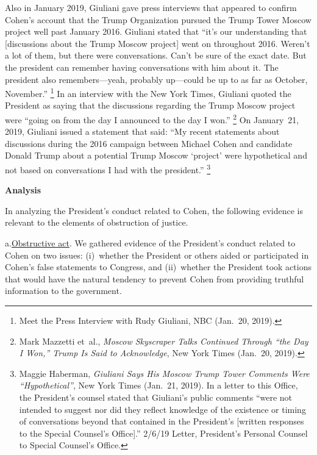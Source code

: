 Also in January 2019, Giuliani gave press interviews that appeared to confirm Cohen's account that the Trump Organization pursued the Trump Tower Moscow project well past January 2016.
Giuliani stated that ``it's our understanding that [discussions about the Trump Moscow project] went on throughout 2016.
Weren't a lot of them, but there were conversations.
Can't be sure of the exact date.
But the president can remember having conversations with him about it.
The president also remembers---yeah, probably up---could be up to as far as October, November.''%
\footnote{Meet the Press Interview with Rudy Giuliani, NBC (Jan.~20, 2019).}
In an interview with the New York Times, Giuliani quoted the President as saying that the discussions regarding the Trump Moscow project were ``going on from the day I announced to the day I won.''%
\footnote{Mark Mazzetti et~al., \textit{Moscow Skyscraper Talks Continued Through ``the Day I Won,'' Trump Is Said to Acknowledge}, New York Times (Jan.~20, 2019).}
On January~21, 2019, Giuliani issued a statement that said: ``My recent statements about discussions during the 2016 campaign between Michael Cohen and candidate Donald Trump about a potential Trump Moscow `project' were hypothetical and not based on conversations I had with the president.''%
\footnote{Maggie Haberman, \textit{Giuliani Says His Moscow Trump Tower Comments Were ``Hypothetical''}, New York Times (Jan.~21, 2019).
In a letter to this Office, the President's counsel stated that Giuliani's public comments ``were not intended to suggest nor did they reflect knowledge of the existence or timing of conversations beyond that contained in the President's [written responses to the Special Counsel's Office].''
2/6/19 Letter, President's Personal Counsel to Special Counsel's Office.}

\filbreak

\begin{center}
\textbf{Analysis}
\end{center}

In analyzing the President's conduct related to Cohen, the following evidence is relevant to the elements of obstruction of justice.

a.\qquad\underline{Obstructive act}.
We gathered evidence of the President's conduct related to Cohen on two issues:
(i)~whether the President or others aided or participated in Cohen's false statements to Congress, and
(ii)~whether the President took actions that would have the natural tendency to prevent Cohen from providing truthful information to the government.

